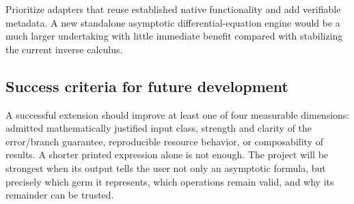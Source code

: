 Prioritize adapters that reuse established native functionality and add verifiable metadata. A new standalone asymptotic differential-equation engine would be a much larger undertaking with little immediate benefit compared with stabilizing the current inverse calculus.\cite{wl-integrate,wl-sum,wl-dsolve,wl-rsolve}

\subsection{Success criteria for future development}

A successful extension should improve at least one of four measurable dimensions: admitted mathematically justified input class, strength and clarity of the error/branch guarantee, reproducible resource behavior, or composability of results. A shorter printed expression alone is not enough. The project will be strongest when its output tells the user not only an asymptotic formula, but precisely which germ it represents, which operations remain valid, and why its remainder can be trusted.
